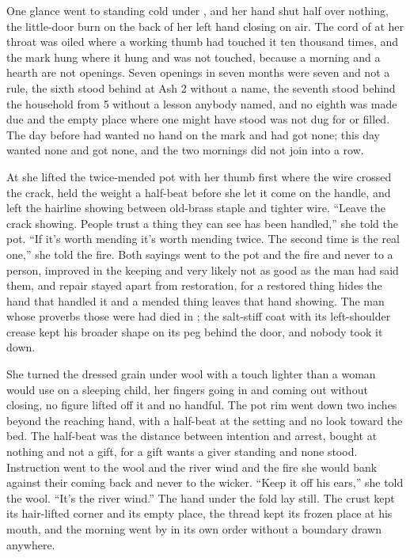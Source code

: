 One glance went to  standing cold under , and her hand shut half over nothing, the little-door burn on the back of her left hand closing on air. The cord of  at her throat was oiled where a working thumb had touched it ten thousand times, and the mark hung where it hung and was not touched, because a morning and a hearth are not openings. Seven openings in seven months were seven and not a rule, the sixth stood behind at Ash 2 without a name, the seventh stood behind the household from  5 without a lesson anybody named, and no eighth was made due and the empty place where one might have stood was not dug for or filled. The day before had wanted no hand on the mark and had got none; this day wanted none and got none, and the two mornings did not join into a row.

At  she lifted the twice-mended pot with her thumb first where the wire crossed the crack, held the weight a half-beat before she let it come on the handle, and left the hairline showing between old-brass staple and tighter wire. “Leave the crack showing. People trust a thing they can see has been handled,” she told the pot. “If it's worth mending it's worth mending twice. The second time is the real one,” she told the fire. Both sayings went to the pot and the fire and never to a person, improved in the keeping and very likely not as good as the man had said them, and repair stayed apart from restoration, for a restored thing hides the hand that handled it and a mended thing leaves that hand showing. The man whose proverbs those were had died in ; the salt-stiff coat with its left-shoulder crease kept his broader shape on its peg behind the door, and nobody took it down.

She turned the dressed grain under wool with a touch lighter than a woman would use on a sleeping child, her fingers going in and coming out without closing, no figure lifted off it and no handful. The pot rim went down two inches beyond the reaching hand, with a half-beat at the setting and no look toward the bed. The half-beat was the distance between intention and arrest, bought at nothing and not a gift, for a gift wants a giver standing and none stood. Instruction went to the wool and the river wind and the fire she would bank against their coming back and never to the wicker. “Keep it off his ears,” she told the wool. “It's the river wind.” The hand under the fold lay still. The crust kept its hair-lifted corner and its empty place, the thread kept its frozen place at his mouth, and the morning went by in its own order without a boundary drawn anywhere.

